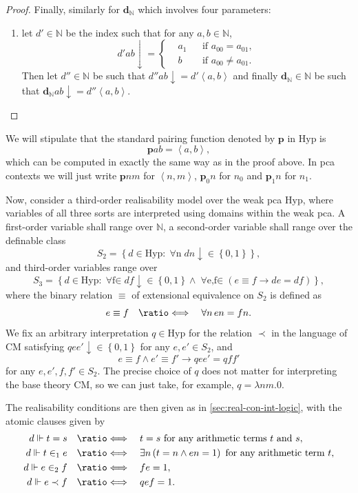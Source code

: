 \documentclass[12pt,openany]{book}
\theoremstyle{plain}
\theoremstyle{definition}
\newcommand\uplabel[1]{\textup{(#1)}}
\newcommand\tuple[1]{\left\langle #1 \right\rangle}
\newcommand\opA[1]{\mathop{\forall #1}}
\newcommand\opE[1]{\mathop{\exists #1}}
\newcommand\defeqv{\quad \ratio\Longleftrightarrow \quad}
\newcommand\CM{\mathrm{CM}}
\newcommand\Hyp{\mathrm{Hyp}}
\newcommand\bp{\mathbf{p}}
\newcommand\bdN{\mathbf{d}_\mathbb{N}}
\begin{document}
\begin{proof}
  Finally, similarly for $\bdN$ which involves four parameters:
  \begin{enumerate}[label=\uplabel{\roman*},resume]
    \item let $d' \in \mathbb{N}$ be the index such that for any $a, b \in \mathbb{N}$,
          \[d' ab {\downarrow} = \left\{\begin{aligned}
               & a_1 &  & \text{if $a_{00} = a_{01}$},    \\
               & b   &  & \text{if $a_{00} \neq a_{01}$}.
            \end{aligned}\right.\]
          Then let $d'' \in \mathbb{N}$ be such that $d'' ab {\downarrow} = d' \tuple{a, b}$ and finally $\bdN \in \mathbb{N}$ be such that $\bdN ab {\downarrow} = d'' \tuple{a, b}$. \qedhere
  \end{enumerate}
\end{proof}

We will stipulate that the standard pairing function denoted by $\bp$ in $\Hyp$ is
\[\bp ab = \tuple{a, b},\]
which can be computed in exactly the same way as in the proof above. In pca contexts we will just write $\bp n m$ for $\tuple{n, m}$, $\bp_0 n$ for $n_0$ and $\bp_1 n$ for $n_1$.

Now, consider a third-order realisability model over the weak pca $\Hyp$, where variables of all three sorts are interpreted using domains within the weak pca. A first-order variable shall range over $\mathbb{N}$, a second-order variable shall range over the definable class
\[S_2 = \left\{d \in \Hyp : \opA{n} dn {\downarrow} \in \left\{0, 1\right\}\right\},\]
and third-order variables range over
\[S_3 = \left\{d \in \Hyp : \opA{f \in S_2} df {\downarrow} \in \left\{0, 1\right\} \land \opA{e, f \in S_2} \left(e \equiv f \rightarrow de = df\right)\right\},\]
where the binary relation $\equiv$ of extensional equivalence on $S_2$ is defined as
\[e \equiv f \defeqv \opA{n} en = fn.\]
We fix an arbitrary interpretation $q \in \Hyp$ for the relation $\prec$ in the language of $\CM$ satisfying $qe e' {\downarrow} \in \left\{0, 1\right\}$ for any $e, e' \in S_2$, and
\[e \equiv f \land e' \equiv f' \rightarrow qe e' = qf f'\]
for any $e, e', f, f' \in S_2$. The precise choice of $q$ does not matter for interpreting the base theory $\CM$, so we can just take, for example, $q = \lambda nm. 0$.

The realisability conditions are then given as in \autoref{sec:real-con-int-logic}, with the atomic clauses given by
\begin{align*}
  d \Vdash t = s     & \defeqv t = s \text{ for any arithmetic terms $t$ and $s$},                          \\
  d \Vdash t \in_1 e & \defeqv \opE{n} \left(t = n \land en = 1\right) \text{ for any arithmetic term $t$}, \\
  d \Vdash e \in_2 f & \defeqv fe = 1,                                                                      \\
  d \Vdash e \prec f & \defeqv qef = 1.
\end{align*}
\end{document}

